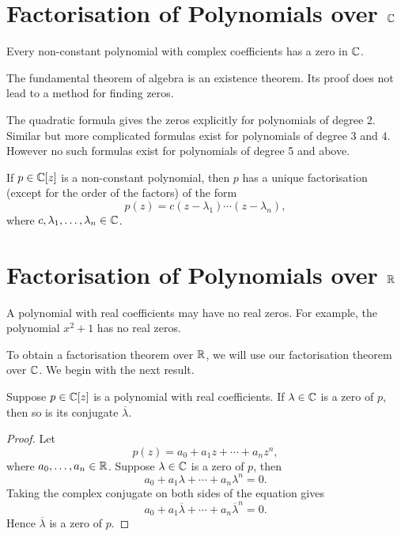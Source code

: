 \section{Factorisation of Polynomials over $\mathbb C$}
\begin{theorem}\label{thrm:fundamental-theorem-of-algebra-first-version}
Every non-constant polynomial with complex coefficients has a zero in $\mathbb C$.
\end{theorem}

\begin{remark}
The fundamental theorem of algebra is an existence theorem. Its proof does not lead to a method for finding zeros. 

The quadratic formula gives the zeros explicitly for polynomials of degree 2. Similar but more complicated formulas exist for polynomials of degree 3 and 4. However no such formulas exist for polynomials of degree 5 and above.
\end{remark}

\begin{theorem}\label{thrm:fundamental-theorem-of-algebra-second-version}
If $p\in\mathbb C[z]$ is a non-constant polynomial, then $p$ has a unique factorisation (except for the order of the factors) of the form
\[p(z)=c(z-\lambda_1)\cdots(z-\lambda_n),\]
where $c,\lambda_1,\dots,\lambda_n\in\mathbb C$.
\end{theorem}
\pagebreak

\section{Factorisation of Polynomials over $\mathbb R$}
A polynomial with real coefficients may have no real zeros. For example, the polynomial $x^2+1$ has no real zeros.

To obtain a factorisation theorem over $\mathbb R$, we will use our factorisation theorem over $\mathbb C$. We begin with the next result.

\begin{lemma}
Suppose $p\in\mathbb C[z]$ is a polynomial with real coefficients. If $\lambda\in\mathbb C$ is a zero of $p$, then so is its conjugate $\overline{\lambda}$.
\end{lemma}

\begin{proof}
Let
\[p(z)=a_0+a_1z+\cdots+a_nz^n,\]
where $a_0,\dots,a_n\in\mathbb R$. Suppose $\lambda\in\mathbb C$ is a zero of $p$, then
\[a_0+a_1\lambda+\cdots+a_n\lambda^n=0.\]
Taking the complex conjugate on both sides of the equation gives
\[a_0+a_1\overline{\lambda}+\cdots+a_n\overline{\lambda}^n=0.\]
Hence $\overline{\lambda}$ is a zero of $p$.
\end{proof}

